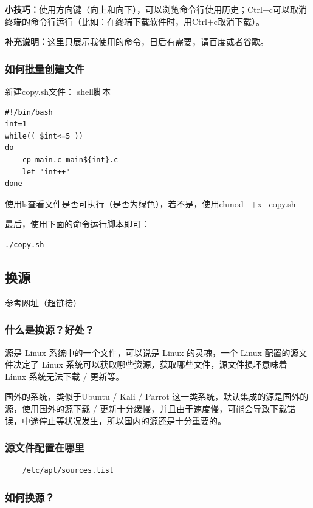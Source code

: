 \documentclass[12pt]{article}
\begin{document}
\textbf{小技巧：}使用方向键（向上和向下），可以浏览命令行使用历史；Ctrl\(+\)c可以取消终端的命令行运行（比如：在终端下载软件时，用Ctrl\(+\)c取消下载）。

\textbf{补充说明：}这里只展示我使用的命令，日后有需要，请百度或者谷歌。

\subsubsection{如何批量创建文件}



\noindent 新建copy.sh文件：
shell脚本
\begin{verbatim}
#!/bin/bash
int=1
while(( $int<=5 ))
do
    cp main.c main${int}.c
    let "int++"
done
\end{verbatim}

\noindent 使用ls查看文件是否可执行（是否为绿色），若不是，使用chmod~ \(+\)x ~copy.sh

\noindent 最后，使用下面的命令运行脚本即可：
\begin{verbatim}
./copy.sh
\end{verbatim}


\subsection{换源}

\href{https://blog.csdn.net/qq_40520596/article/details/110194439}{参考网址（超链接）}

\subsubsection{什么是换源？好处？}
源是 Linux 系统中的一个文件，可以说是 Linux 的灵魂，一个 Linux 配置的源文件决定了 Linux 系统可以获取哪些资源，获取哪些文件，源文件损坏意味着 Linux 系统无法下载 / 更新等。

国外的系统，类似于Ubuntu / Kali / Parrot 这一类系统，默认集成的源是国外的源，使用国外的源下载 / 更新十分缓慢，并且由于速度慢，可能会导致下载错误，中途停止等状况发生，所以国内的源还是十分重要的。
\subsubsection{源文件配置在哪里}
\begin{verbatim}
    /etc/apt/sources.list
\end{verbatim}

\subsubsection{如何换源？}
\end{document}

